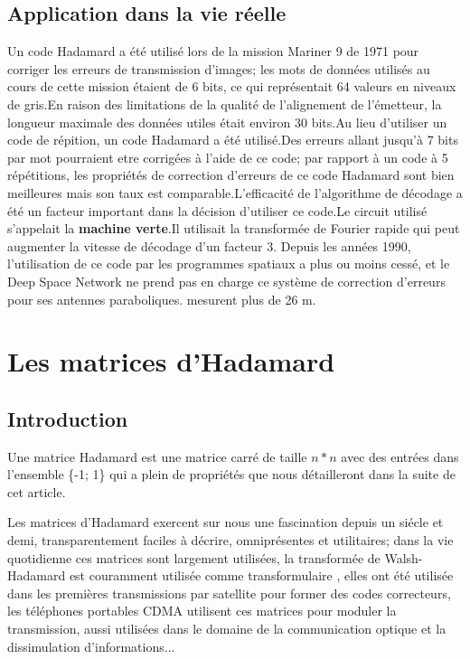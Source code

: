 \documentclass{article}
\begin{document}
\subsection{Application dans la vie réelle}

Un code Hadamard a été utilisé lors de la mission Mariner 9 de 1971 pour
corriger les erreurs de transmission d'images; les mots de données 
utilisés au cours de cette mission étaient de 6 bits, ce qui représentait 
64 valeurs en niveaux de gris.En raison des limitations de la qualité de 
l'alignement de l'émetteur, la longueur maximale des données utiles était 
environ 30 bits.Au lieu d'utiliser un code de répition, un code Hadamard
a été utilisé.Des erreurs allant jusqu'à 7 bits par mot pourraient etre 
corrigées à l'aide de ce code; par rapport à un code à 5 répétitions, les
propriétés de correction d'erreurs de ce code Hadamard sont bien meilleures
mais son taux est comparable.L’efficacité de l’algorithme de décodage a été
un facteur important dans la décision d’utiliser ce code.Le circuit 
utilisé s'appelait la \textbf{machine verte}.Il utilisait la transformée de
Fourier rapide qui peut augmenter la vitesse de décodage d'un facteur 3.
Depuis les années 1990, l'utilisation de ce code par les programmes 
spatiaux a plus ou moins cessé, et le Deep Space Network ne prend pas en 
charge ce système de correction d'erreurs pour ses antennes paraboliques.
mesurent plus de 26 m.

\section{Les matrices d'Hadamard}

\subsection{Introduction}
Une matrice Hadamard est une matrice carré de taille $n*n$ avec des entrées
dans l'ensemble \{-1; 1\} qui a plein de propriétés que nous détailleront 
dans la suite de cet article.

Les matrices d'Hadamard exercent sur nous une fascination depuis un siécle
et demi, transparentement faciles à décrire, omniprésentes et utilitaires;
dans la vie quotidienne ces matrices sont largement utilisées, la 
transformée de Walsh-Hadamard est couramment utilisée comme transformulaire
, elles ont été utilisée dans les premières transmissions par satellite 
pour former des codes correcteurs, les téléphones portables CDMA utilisent 
ces matrices pour moduler la transmission, aussi utilisées dans le domaine
de la communication optique et la dissimulation d'informations...
\end{document}
